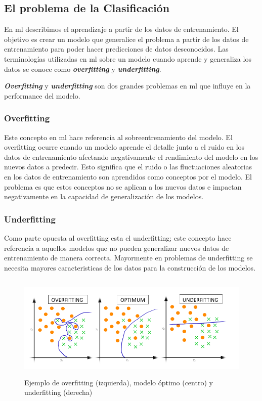 \subsection{El problema de la Clasificación}\label{sub:malaclasificacion}
En \ac{ml} describimos el aprendizaje a partir de los datos de entrenamiento. El objetivo es crear un modelo que generalice el problema a partir de los datos de entrenamiento para poder hacer predicciones de datos desconocidos. Las terminologías utilizadas en \ac{ml} sobre un modelo cuando aprende y generaliza los datos se conoce como  \textit{\textbf{overfitting}} y \textit{\textbf{underfitting}}.

\textit{\textbf{Overfitting}} y \textit{\textbf{underfitting}} son dos grandes problemas en \ac{ml} que influye en la performance del modelo. 

\subsubsection{Overfitting}
Este concepto en \ac{ml} hace referencia al sobreentrenamiento del modelo. El overfitting ocurre cuando un modelo aprende el detalle junto a el ruido en los datos de entrenamiento afectando negativamente el rendimiento del modelo en los nuevos datos a predecir. Esto significa que el ruido o las fluctuaciones aleatorias en los datos de entrenamiento son aprendidos como conceptos por el modelo. El problema es que estos conceptos no se aplican a los nuevos datos e impactan negativamente en la capacidad de generalización de los modelos.

\subsubsection{Underfitting}
Como parte opuesta al overfitting esta el  underfitting; este concepto hace referencia a aquellos modelos que no pueden generalizar nuevos datos de entrenamiento de manera correcta. Mayormente en problemas de underfitting se necesita mayores caracteristicas de los datos para la construcción de los modelos.

\begin{figure}[h]
 \centering
  \includegraphics[height=5cm,keepaspectratio=true,clip=true]{imagenes/Logos/OverFUnderF.png}
  \caption{Ejemplo de overfitting (izquierda), modelo óptimo (centro) y underfitting (derecha)}
	\label{Fig: overUnder}
\end{figure}

